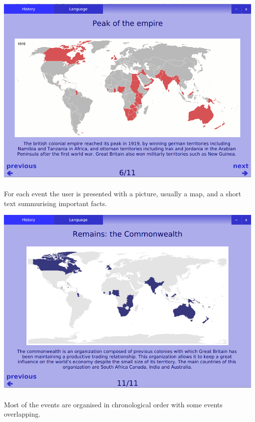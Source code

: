 \documentclass[11pt, a4paper]{report}
\begin{document}
\vspace{0.3cm}
\centerline{\includegraphics[scale=0.4]{images/peakEmpire.png}}

\paragraph{}For each event the user is presented with a picture, usually a map, and a short text summurising important facts.

\vspace{0.3cm}
\centerline{\includegraphics[scale=0.4]{images/commonwealth.png}}

\paragraph{}Most of the events are organised in chronological order with some events overlapping.
\end{document}
